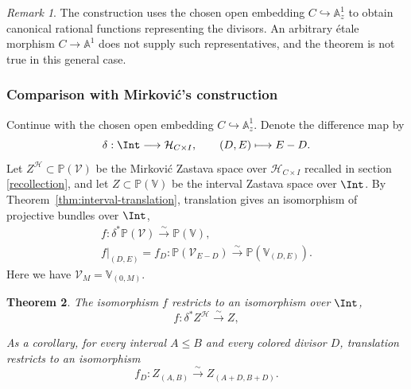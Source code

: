 \documentclass{amsart}
\numberwithin{equation}{section}
\numberwithin{figure}{section}
\newtheorem{thm}{Theorem}[section]
\theoremstyle{definition}
\theoremstyle{remark}
\newtheorem{rmk}[thm]{Remark}
\renewcommand{\c}[1]{\mathcal{#1}}
\renewcommand{\b}[1]{\mathbb{#1}}
\begin{document}
\begin{rmk}
	The construction uses the chosen open embedding
	$C\hookrightarrow\b A^1_z$ to obtain canonical rational functions representing the divisors.
	An arbitrary \'etale morphism $C\to\b A^1$ does not supply such representatives, and the theorem is not true in this general case.
\end{rmk}

\subsubsection{Comparison with Mirkovi\'c's construction}
Continue with the chosen open embedding $C\hookrightarrow\b A^1_z$.
Denote the difference map by
\[
\delta:\Int\longrightarrow\c H_{C\times I},\qquad (D,E)\longmapsto E-D.
\]
Let $Z^{\c H}\subset\b P(\c V)$ be the Mirkovi\'c Zastava space over $\c H_{C\times I}$ recalled in section \ref{recollection}, and let $Z\subset\b P(\b V)$ be the interval Zastava space over $\Int$. 
By Theorem~\ref{thm:interval-translation}, translation gives an
isomorphism of projective bundles over $\Int$,
\[
\begin{gathered}
	f:\delta^*\b P(\c V)\xrightarrow{\sim}\b P(\b V),\\
	f|_{(D,E)}=f_D:
	\b P(\c V_{E-D})\xrightarrow{\sim}\b P(\b V_{(D,E)}).
\end{gathered}
\]
Here we have $\c V_M=\b V_{(0,M)}$.

\begin{thm}
	\label{thm:zastava-comparison}
	The isomorphism $f$ restricts to an isomorphism over $\Int$,
	\[
	f:\delta^*Z^{\c H}\xrightarrow{\sim}Z,
	\]

As a corollary, for every interval $A\leq B$ and every colored divisor $D$, translation
restricts to an isomorphism
\[
f_D:Z_{(A,B)}\xrightarrow{\sim}Z_{(A+D,B+D)}.
\]
\end{thm}
\end{document}
